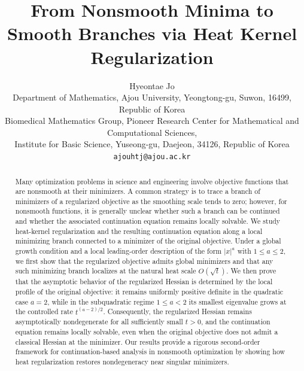 \documentclass{article}
\title{From Nonsmooth Minima to Smooth Branches via Heat Kernel Regularization}
\author{
 Hyeontae Jo \\
  Department of Mathematics, Ajou University, Yeongtong-gu, Suwon, 16499, Republic of Korea \\
  Biomedical Mathematics Group, Pioneer Research Center for Mathematical and Computational Sciences,\\
  Institute for Basic Science, Yuseong-gu, Daejeon, 34126, Republic of Korea\\
  \texttt{ajouhtj@ajou.ac.kr} \\
}
\begin{document}
\maketitle
\begin{abstract}
Many optimization problems in science and engineering involve objective functions that are nonsmooth at their minimizers. A common strategy is to trace a branch of minimizers of a regularized objective as the smoothing scale tends to zero; however, for nonsmooth functions, it is generally unclear whether such a branch can be continued and whether the associated continuation equation remains locally solvable. We study heat-kernel regularization and the resulting continuation equation along a local minimizing branch connected to a minimizer of the original objective. Under a global growth condition and a local leading-order description of the form $|x|^a$ with $1 \le a \le 2$, we first show that the regularized objective admits global minimizers and that any such minimizing branch localizes at the natural heat scale $O(\sqrt{t})$. We then prove that the asymptotic behavior of the regularized Hessian is determined by the local profile of the original objective: it remains uniformly positive definite in the quadratic case $a=2$, while in the subquadratic regime $1 \le a < 2$ its smallest eigenvalue grows at the controlled rate $t^{(a-2)/2}$. Consequently, the regularized Hessian remains asymptotically nondegenerate for all sufficiently small $t>0$, and the continuation equation remains locally solvable, even when the original objective does not admit a classical Hessian at the minimizer. Our results provide a rigorous second-order framework for continuation-based analysis in nonsmooth optimization by showing how heat regularization restores nondegeneracy near singular minimizers.
\end{abstract}
\end{document}
